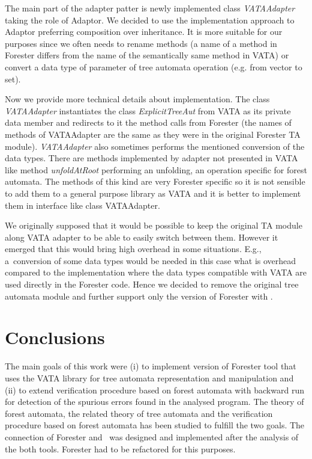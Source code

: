 \documentclass[fleqn,11pt]{ExcelAtFIT} %
\begin{document}
The main part of the adapter patter is newly implemented class \emph{VATAAdapter} taking the role of Adaptor.
We decided to use the implementation approach to Adaptor preferring composition over inheritance.
It is more suitable for our purposes since we often needs to rename methods 
(a name of a method in Forester differs from the name of the semantically same method in VATA)
or convert a data type of parameter of tree automata operation (e.g. from vector to set). 

Now we provide more technical details about implementation.
The class \emph{VATAAdapter} instantiates the class \emph{ExplicitTreeAut} from VATA as its private data member
and redirects to it the method calls from Forester (the names of methods of VATAAdapter are the same as they were
in the original Forester TA module).
\emph{VATAAdapter} also sometimes performs the mentioned conversion of the data types.
There are methods implemented by adapter not presented in VATA like method \emph{unfoldAtRoot}
performing an unfolding, an operation specific for forest automata.
The methods of this kind are very Forester specific so it is not sensible to add them to a general purpose library as VATA
and it is better to implement them in interface like class VATAAdapter.

We originally supposed that it would be possible to keep the original TA module along VATA adapter
to be able to easily switch between them.
However it emerged that this would bring high overhead in some situations.
E.g., a~conversion of some data types would be needed in this case
what is overhead compared to the implementation where the data types compatible with VATA are used directly in the Forester code.
Hence we decided to remove the original tree automata module and further support only the version of Forester with \vata.

\section{Conclusions}
\label{sec:concl}

The main goals of this work were (i) to implement version of Forester tool that uses the VATA library for tree automata representation and manipulation
and (ii) to extend verification procedure based on forest automata with backward run for detection of the spurious errors found in the analysed program.
The theory of forest automata, the related theory of tree automata and the verification procedure based on forest automata has been studied to fulfill the two goals.
The connection of Forester and \vata\ was designed and implemented after the analysis of the both tools.
Forester had to be refactored for this purposes.
\end{document}
